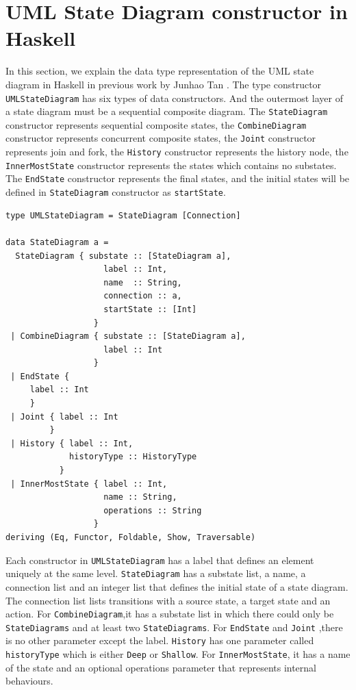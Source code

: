 \section{ UML State Diagram constructor in Haskell}
\label{sec:UML state Diagram}
In this section, we explain the data type representation of the UML state diagram in Haskell in previous work by Junhao Tan \cite{jun_hao_tan}.
The type constructor \verb|UMLStateDiagram| has six types of data constructors.
And the outermost layer of a state diagram must be a sequential composite diagram.
The \verb|StateDiagram| constructor represents sequential composite states, 
the \verb|CombineDiagram| constructor represents concurrent composite states, 
the \verb|Joint| constructor represents join and fork,
the \verb|History| constructor represents the history node, 
the \verb|InnerMostState| constructor represents the states which contains no substates. 
The \verb|EndState| constructor represents the final states, and the initial states will be defined in \verb|StateDiagram| constructor as \verb|startState|.
   
\begin{verbatim}
type UMLStateDiagram = StateDiagram [Connection]

data StateDiagram a = 
  StateDiagram { substate :: [StateDiagram a],
                    label :: Int,
                    name  :: String,
                    connection :: a,
                    startState :: [Int]
                  }
 | CombineDiagram { substate :: [StateDiagram a],
                    label :: Int
                  }
 | EndState {
     label :: Int
     }
 | Joint { label :: Int
         }
 | History { label :: Int,
             historyType :: HistoryType
           }
 | InnerMostState { label :: Int,
                    name :: String,
                    operations :: String
                  }
deriving (Eq, Functor, Foldable, Show, Traversable)
\end{verbatim}

Each constructor in \verb|UMLStateDiagram| has a label that defines an element uniquely at the same level.
\verb|StateDiagram| has a substate list, a name, a connection list and an integer list that defines the initial state of a state diagram. The connection list lists transitions with a source state, a target state and an action.
For \verb|CombineDiagram|,it has a substate list in which there could only be \verb|StateDiagrams| and at least two \verb|StateDiagrams|.
For \verb|EndState| and \verb|Joint| ,there is no other parameter except the label.
\verb|History| has one parameter called \verb|historyType| which is either \verb|Deep| or \verb|Shallow|.
For \verb|InnerMostState|, it has a name of the state and an optional operations parameter that represents internal behaviours.

